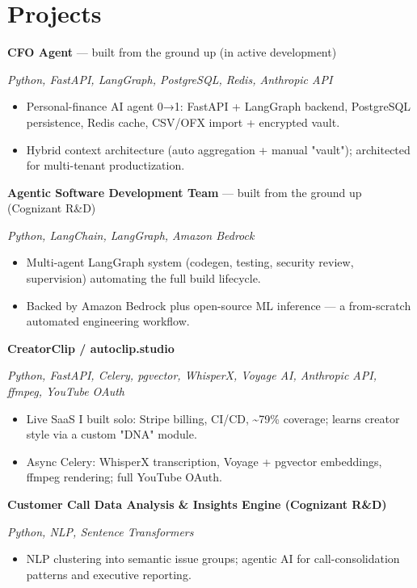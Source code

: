 \documentclass[10pt]{article}
\begin{document}
\section*{Projects}
\noindent\textbf{CFO Agent} --- built from the ground up (in active development)\par
\noindent\textit{Python, FastAPI, LangGraph, PostgreSQL, Redis, Anthropic API}\par
\begin{itemize}
  \item Personal-finance AI agent 0→1: FastAPI + LangGraph backend, PostgreSQL persistence, Redis cache, CSV/OFX import + encrypted vault.
  \item Hybrid context architecture (auto aggregation + manual "vault"); architected for multi-tenant productization.
\end{itemize}
\noindent\textbf{Agentic Software Development Team} --- built from the ground up (Cognizant R\&D)\par
\noindent\textit{Python, LangChain, LangGraph, Amazon Bedrock}\par
\begin{itemize}
  \item Multi-agent LangGraph system (codegen, testing, security review, supervision) automating the full build lifecycle.
  \item Backed by Amazon Bedrock plus open-source ML inference — a from-scratch automated engineering workflow.
\end{itemize}
\noindent\textbf{CreatorClip / autoclip.studio}\par
\noindent\textit{Python, FastAPI, Celery, pgvector, WhisperX, Voyage AI, Anthropic API, ffmpeg, YouTube OAuth}\par
\begin{itemize}
  \item Live SaaS I built solo: Stripe billing, CI/CD, \textasciitilde{}79\% coverage; learns creator style via a custom "DNA" module.
  \item Async Celery: WhisperX transcription, Voyage + pgvector embeddings, ffmpeg rendering; full YouTube OAuth.
\end{itemize}
\noindent\textbf{Customer Call Data Analysis \& Insights Engine (Cognizant R\&D)}\par
\noindent\textit{Python, NLP, Sentence Transformers}\par
\begin{itemize}
  \item NLP clustering into semantic issue groups; agentic AI for call-consolidation patterns and executive reporting.
\end{itemize}
\end{document}

